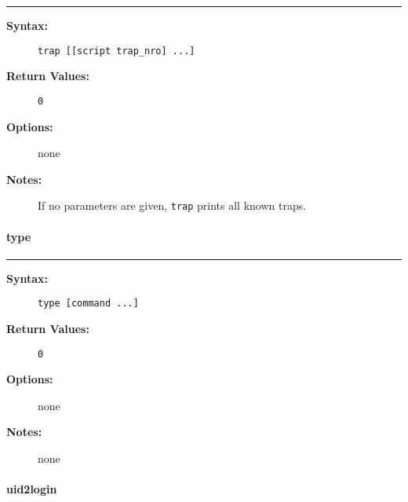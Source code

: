 \hrule
\begin{description}
\item[{\bf Syntax:}] \mbox{}

{\tt trap [[script trap\_nro] ...]}

\item[{\bf Return Values:}] \mbox{}

\begin{description}
\item[{\tt 0}] \mbox{}



\end{description}


\item[{\bf Options:}] \mbox{}

none  

\item[{\bf Notes:}] \mbox{}

If no parameters are given, {\tt trap} prints all 
known traps.

\end{description}


\vspace {2pt}


\paragraph{type}

\hrule
\begin{description}
\item[{\bf Syntax:}] \mbox{}

{\tt type [command ...]}

\item[{\bf Return Values:}] \mbox{}

\begin{description}
\item[{\tt 0}] \mbox{}



\end{description}


\item[{\bf Options:}] \mbox{}

none  

\item[{\bf Notes:}] \mbox{}

none

\end{description}


\vspace {2pt}


\paragraph{uid2login}

